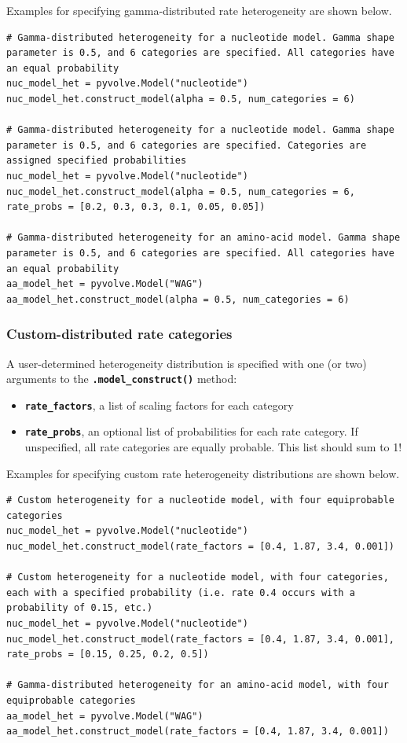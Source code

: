 \documentclass{article}
\newcommand{\code}[1]{\textbf{\texttt{\small{#1}}}}
\begin{document}
Examples for specifying gamma-distributed rate heterogeneity are shown below.

\begin{lstlisting}
# Gamma-distributed heterogeneity for a nucleotide model. Gamma shape parameter is 0.5, and 6 categories are specified. All categories have an equal probability
nuc_model_het = pyvolve.Model("nucleotide")
nuc_model_het.construct_model(alpha = 0.5, num_categories = 6)

# Gamma-distributed heterogeneity for a nucleotide model. Gamma shape parameter is 0.5, and 6 categories are specified. Categories are assigned specified probabilities
nuc_model_het = pyvolve.Model("nucleotide")
nuc_model_het.construct_model(alpha = 0.5, num_categories = 6, rate_probs = [0.2, 0.3, 0.3, 0.1, 0.05, 0.05])

# Gamma-distributed heterogeneity for an amino-acid model. Gamma shape parameter is 0.5, and 6 categories are specified. All categories have an equal probability
aa_model_het = pyvolve.Model("WAG")
aa_model_het.construct_model(alpha = 0.5, num_categories = 6)
\end{lstlisting}

\subsubsection{Custom-distributed rate categories}

A user-determined heterogeneity distribution is specified with one (or two) arguments to the \code{.model\_construct()} method:
\begin{itemize}
	\item \code{rate\_factors}, a list of scaling factors for each category
	\item \code{rate\_probs}, an optional list of probabilities for each rate category. If unspecified, all rate categories are equally probable. This list should sum to 1!
\end{itemize}

Examples for specifying custom rate heterogeneity distributions are shown below.
\begin{lstlisting}
# Custom heterogeneity for a nucleotide model, with four equiprobable categories
nuc_model_het = pyvolve.Model("nucleotide")
nuc_model_het.construct_model(rate_factors = [0.4, 1.87, 3.4, 0.001])

# Custom heterogeneity for a nucleotide model, with four categories, each with a specified probability (i.e. rate 0.4 occurs with a probability of 0.15, etc.)
nuc_model_het = pyvolve.Model("nucleotide")
nuc_model_het.construct_model(rate_factors = [0.4, 1.87, 3.4, 0.001], rate_probs = [0.15, 0.25, 0.2, 0.5])

# Gamma-distributed heterogeneity for an amino-acid model, with four equiprobable categories
aa_model_het = pyvolve.Model("WAG")
aa_model_het.construct_model(rate_factors = [0.4, 1.87, 3.4, 0.001])
\end{lstlisting}
\end{document}

